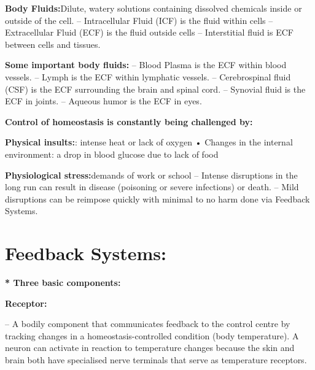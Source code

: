 \documentclass[12pt]{article}
\begin{document}
\item\textbf{Body Fluids:}Dilute, watery solutions containing dissolved chemicals inside or outside of
the cell.
\newline– Intracellular Fluid (ICF) is the fluid within cells
\newline– Extracellular Fluid (ECF) is the fluid outside cells
\newline– Interstitial fluid is ECF between cells and tissues.
\item\textbf{Some important body fluids:}
\newline– Blood Plasma is the ECF within blood vessels.
\newline– Lymph is the ECF within lymphatic vessels.
\newline– Cerebrospinal fluid (CSF) is the ECF surrounding the brain and
spinal cord.
\newline– Synovial fluid is the ECF in joints.
\newline– Aqueous humor is the ECF in eyes.

\textbf{Control of homeostasis is constantly being challenged by:
}
\item\textbf{Physical insults:}: intense heat or lack of oxygen
\newline• Changes in the internal environment: a drop in blood glucose due to lack
of food
\item\textbf{Physiological stress:}demands of work or school
\newline– Intense disruptions in the long run can result in disease (poisoning
or severe infections) or death.\newline
– Mild disruptions can be reimpose quickly with minimal to no harm
done via Feedback Systems.

\section{Feedback Systems:}
\item\textbf{* Three basic components:
}
\item\textbf{Receptor:}

\newline– A bodily component that communicates feedback to the control centre by tracking changes in a homeostasis-controlled condition (body temperature).
A neuron can activate in reaction to temperature changes because the skin and brain both have specialised nerve terminals that serve as temperature receptors.
\end{document}
